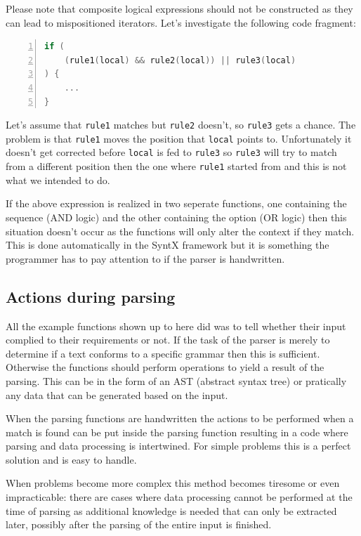 \documentclass[12pt]{article}
\newcommand{\usubsec}[2]{\subsection*{#1}\label{subsec:#2}\addcontentsline{toc}{subsection}{#1}}
\begin{document}
Please note that composite logical expressions should not be constructed as they can lead to mispositioned
iterators. Let's investigate the following code fragment:

\begin{center}
	\begin{minipage}[h]{0.8\textwidth}
		\begin{lstlisting}[language=C++, breaklines=true, numbers=left]
if (
	(rule1(local) && rule2(local)) || rule3(local)
) {
	...
}
		\end{lstlisting}
	\end{minipage}
\end{center}

Let's assume that \texttt{rule1} matches but \texttt{rule2} doesn't, so \texttt{rule3} gets a chance. The
problem is that \texttt{rule1} moves the position that \texttt{local} points to. Unfortunately it doesn't get
corrected before \texttt{local} is fed to \texttt{rule3} so \texttt{rule3} will try to match from a different
position then the one where \texttt{rule1} started from and this is not what we intended to do.

If the above expression is realized in two seperate functions, one containing the sequence (AND logic) and the
other containing the option (OR logic) then this situation doesn't occur as the functions will only alter the
context if they match. This is done automatically in the SyntX framework but it is something the programmer
has to pay attention to if the parser is handwritten.

\usubsec{Actions during parsing}{actions}
All the example functions shown up to here did was to tell whether their input complied to their requirements
or not. If the task of the parser is merely to determine if a text conforms to a specific grammar then this is
sufficient. Otherwise the functions should perform operations to yield a result of the parsing. This can be in
the form of an AST (abstract syntax tree) or pratically any data that can be generated based on the input.

When the parsing functions are handwritten the actions to be performed when a match is found can be put inside
the parsing function resulting in a code where parsing and data processing is intertwined. For simple problems
this is a perfect solution and is easy to handle.

When problems become more complex this method becomes tiresome or even impracticable: there are cases where
data processing cannot be performed at the time of parsing as additional knowledge is needed that can only be
extracted later, possibly after the parsing of the entire input is finished.
\end{document}
